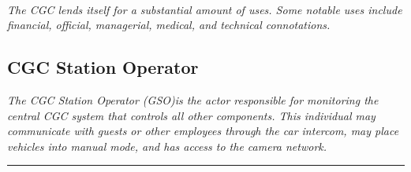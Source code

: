 \documentclass[12pt]{article}
\begin{document}
\paragraph{} \textit{The CGC lends itself for a substantial amount of uses. Some notable uses include financial,
official, managerial, medical, and technical connotations.}

    \subsection{CGC Station Operator}
    \textit{The CGC Station Operator  (GSO)is the actor responsible for monitoring the central CGC system that
    controls all other components. This individual may communicate with guests or other employees 
    through the car intercom, may place vehicles into manual mode, and has access to the camera network.}
    \par\noindent\rule{\textwidth}{0.4pt}    
\end{document}
